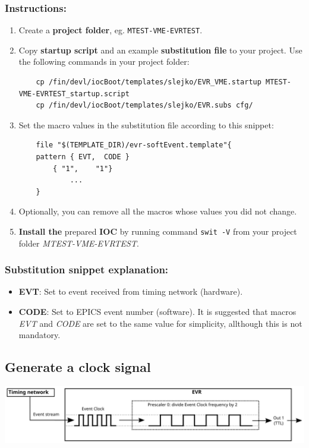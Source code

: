 \documentclass[12pt,a4paper]{article}
\begin{document}
\subsubsection{Instructions:}
\begin{enumerate}
	\item Create a \textbf{project folder}, eg. \texttt{MTEST-VME-EVRTEST}.
	\item Copy \textbf{startup script} and an example \textbf{substitution file} to your project. Use the following commands in your project folder:
\begin{lstlisting}
	cp /fin/devl/iocBoot/templates/slejko/EVR_VME.startup MTEST-VME-EVRTEST_startup.script
	cp /fin/devl/iocBoot/templates/slejko/EVR.subs cfg/
\end{lstlisting}
	\item Set the macro values in the substitution file according to this snippet:
\begin{lstlisting}
	file "$(TEMPLATE_DIR)/evr-softEvent.template"{
	pattern { EVT,	CODE }
		{ "1",    "1"}
			...
	}
\end{lstlisting}
	\item Optionally, you can remove all the macros whose values you did not change. 

	\item \textbf{Install the} prepared \textbf{IOC} by running command \texttt{swit -V} from your project folder \textit{MTEST-VME-EVRTEST}.
\end{enumerate}
\subsubsection{Substitution snippet explanation:}
\begin{itemize}
	\item \textbf{EVT}: Set to event received from timing network (hardware).
	\item \textbf{CODE}: Set to EPICS event number (software).
It is suggested that macros \textit{EVT} and \textit{CODE} are set to the same value for simplicity, allthough this is not mandatory.
\end{itemize}

\subsection{Generate a clock signal}
	\includegraphics[width=\columnwidth]{./img/prescaler}
\end{document}
